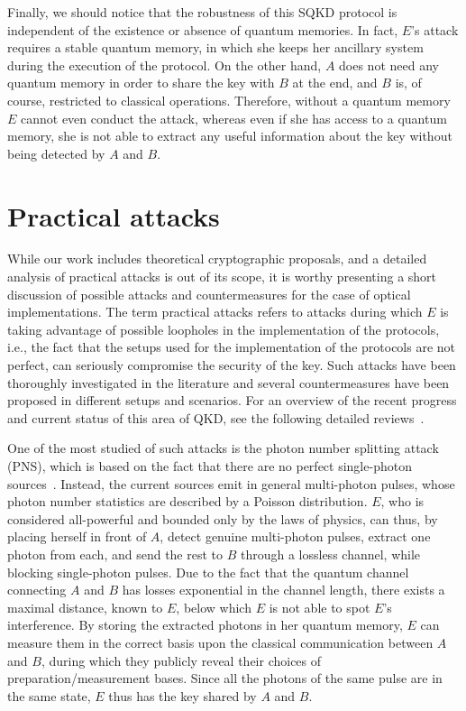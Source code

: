 Finally, we should notice that the robustness of this SQKD protocol is independent of the existence or absence of  quantum memories. In fact, $E$'s attack requires a stable quantum memory, in which she keeps her ancillary system during the execution of the protocol. On the other hand, $A$ does not need any quantum memory in order to share the key with $B$ at the end, and $B$ is, of course, restricted to classical operations. Therefore, without a quantum memory $E$ cannot even conduct the attack, whereas even if she has access to a quantum memory, she is not able to extract any useful information about the key without being detected by $A$ and $B$.


\section{Practical attacks}
\label{sec:prac_att}

While our work includes theoretical cryptographic proposals, and a detailed analysis of practical attacks is out of its scope, it is worthy presenting a short discussion of possible attacks and countermeasures for the case of optical implementations. The term practical attacks refers to attacks during which $E$ is taking advantage of possible loopholes in the implementation of the protocols, i.e., the fact that the setups used for the implementation of the protocols are not perfect, can seriously compromise the security of the key. Such attacks have been thoroughly investigated in the literature and several countermeasures have been proposed in different setups and scenarios. For an overview of the recent progress and current status of this area of QKD, see the following detailed reviews~\cite{sca:bsc:csr:dus:lut:pee:09,jai:sti:kha:els:mar:leu:16,dia:lo:qi:yua:16,bed:arr:lin:17,dix:etal:17}.

One of the most studied of such attacks is the photon number splitting attack (PNS), which is based on the fact that there are no perfect single-photon sources~\cite{bra:lut:mor:san:00,lut:00,lut:jah:02}. Instead, the current sources emit in general multi-photon pulses, whose photon number statistics are described by a Poisson distribution. $E$, who is considered all-powerful and bounded only by the laws of physics, can thus, by placing herself in front of $A$, detect genuine multi-photon pulses, extract one photon from each, and send the rest to $B$ through a lossless channel, while blocking single-photon pulses. Due to the fact that the quantum channel connecting $A$ and $B$ has losses exponential in the channel length, there exists a maximal distance, known to $E$, below which $E$ is not able to spot $E$'s interference. By storing the extracted photons in her quantum memory, $E$ can measure them in the correct basis upon the classical communication between $A$ and $B$, during which they publicly reveal their choices of preparation/measurement bases. Since all the photons of the same pulse are in the same state, $E$ thus has the key shared by $A$ and $B$.

